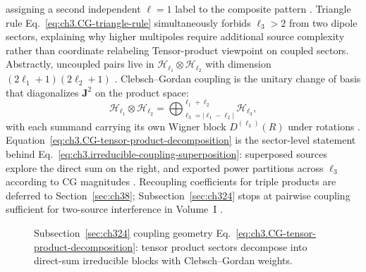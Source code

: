 assigning a second independent \(\ell=1\) label to the composite pattern .
Triangle rule Eq.~\eqref{eq:ch3.CG-triangle-rule} simultaneously forbids \(\ell_3>2\) from two dipole sectors,
explaining why higher multipoles require additional source complexity rather than coordinate relabeling
Tensor-product viewpoint on coupled sectors. Abstractly, uncoupled pairs live in \(\mathcal{H}_{\ell_1}\otimes\mathcal{H}_{\ell_2}\) with dimension
\((2\ell_1+1)(2\ell_2+1)\) . Clebsch--Gordan coupling is the unitary change of basis that
diagonalizes \(\mathbf{J}^{2}\) on the product space:
\begin{equation}
\label{eq:ch3.CG-tensor-product-decomposition}
\mathcal{H}_{\ell_1}\otimes\mathcal{H}_{\ell_2}
=
\bigoplus_{\ell_3=|\ell_1-\ell_2|}^{\ell_1+\ell_2}
\mathcal{H}_{\ell_3},
\end{equation}
with each summand carrying its own Wigner block \(D^{(\ell_3)}(R)\) under rotations
. Equation~\eqref{eq:ch3.CG-tensor-product-decomposition} is the sector-level
statement behind Eq.~\eqref{eq:ch3.irreducible-coupling-superposition}: superposed sources explore the direct
sum on the right, and exported power partitions across \(\ell_3\) according to CG magnitudes
. Recoupling coefficients for triple products are deferred to
Section~\ref{sec:ch38}; Subsection~\ref{sec:ch324} stops at pairwise coupling sufficient for two-source
interference in Volume~I .
\begin{figure}[t]
\centering
{}
\caption{Subsection~\ref{sec:ch324} coupling geometry Eq.~\eqref{eq:ch3.CG-tensor-product-decomposition}: tensor
product sectors decompose into direct-sum irreducible blocks with Clebsch--Gordan weights.}
\label{fig:ch3.CG-coupling-geometry}
\end{figure}

